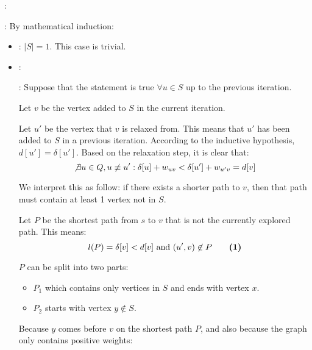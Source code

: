    \par {}:
    \par {}
    \par {}: By mathematical induction:
    \begin{itemize}
      \item {}: $|S| = 1$. This case is trivial.
      \item {}:
        \par {}: Suppose that the statement is true
          $\forall u \in S$ up to the previous iteration.
        \par Let $v$ be the vertex added to $S$ in the current iteration.
        \par Let $u'$ be the vertex that $v$ is relaxed from. This means that
          $u'$ has been added to $S$ in a previous iteration. According to
          the inductive hypothesis, $d[u'] = \delta[u']$. Based on the
          relaxation step, it is clear that:
          \[
            \not \exists u \in Q, u \not \equiv u':
              \delta[u] + w_{uv} < \delta[u'] + w_{u'v} = d[v]
          \]
        \par We interpret this as follow: if there exists a shorter path to
          $v$, then that path must contain at least 1 vertex not in $S$.
        \par Let $P$ be the shortest path from $s$ to $v$ that is not the
        currently explored path. This means:
				\[
          l(P) = \delta[v] < d[v] \mbox{ and } (u', v) \not \in P \qquad\mbox{\textbf{{(1)}}}
				\]
        \par $P$ can be split into two parts:
          \begin{itemize}
            \item $P_1$ which contains only vertices in $S$ and ends with vertex
              $x$.
            \item $P_2$ starts with vertex $y \not \in S$.
          \end{itemize}
        \par Because $y$ comes before $v$ on the shortest path $P$, and also
        because the graph only contains positive weights:

\end{itemize}

